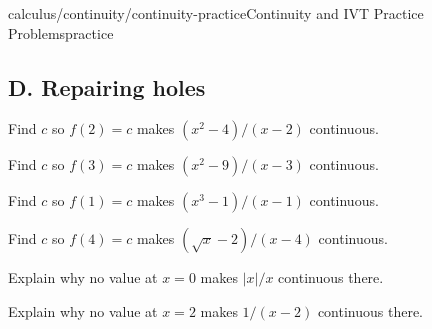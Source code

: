 \documentclass[11pt,openany]{book}
\theoremstyle{bgplain}
\begin{document}
\begin{webpage}{calculus/continuity/continuity-practice}{Continuity and IVT Practice Problems}{practice}
\subsection*{D. Repairing holes}
\begin{bgexercises}[label=\textbf{5.\arabic*},resume]
  \item Find \(c\) so \(f(2)=c\) makes \((x^2-4)/(x-2)\) continuous.
  \item Find \(c\) so \(f(3)=c\) makes \((x^2-9)/(x-3)\) continuous.
  \item Find \(c\) so \(f(1)=c\) makes \((x^3-1)/(x-1)\) continuous.
  \item Find \(c\) so \(f(4)=c\) makes \((\sqrt{x}-2)/(x-4)\) continuous.
  \item Explain why no value at \(x=0\) makes \(|x|/x\) continuous there.
  \item Explain why no value at \(x=2\) makes \(1/(x-2)\) continuous there.
\end{bgexercises}


\end{webpage}
\end{document}
